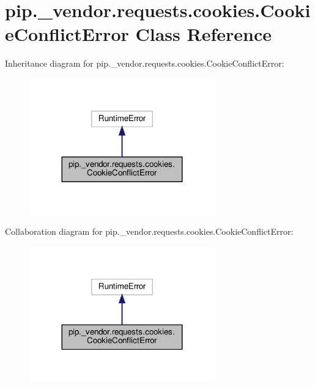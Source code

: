\hypertarget{classpip_1_1__vendor_1_1requests_1_1cookies_1_1CookieConflictError}{}\section{pip.\+\_\+vendor.\+requests.\+cookies.\+Cookie\+Conflict\+Error Class Reference}
\label{classpip_1_1__vendor_1_1requests_1_1cookies_1_1CookieConflictError}


Inheritance diagram for pip.\+\_\+vendor.\+requests.\+cookies.\+Cookie\+Conflict\+Error\+:
\nopagebreak
\begin{figure}[H]
\begin{center}
\leavevmode
\includegraphics[width=227pt]{classpip_1_1__vendor_1_1requests_1_1cookies_1_1CookieConflictError__inherit__graph}
\end{center}
\end{figure}


Collaboration diagram for pip.\+\_\+vendor.\+requests.\+cookies.\+Cookie\+Conflict\+Error\+:
\nopagebreak
\begin{figure}[H]
\begin{center}
\leavevmode
\includegraphics[width=227pt]{classpip_1_1__vendor_1_1requests_1_1cookies_1_1CookieConflictError__coll__graph}
\end{center}
\end{figure}


